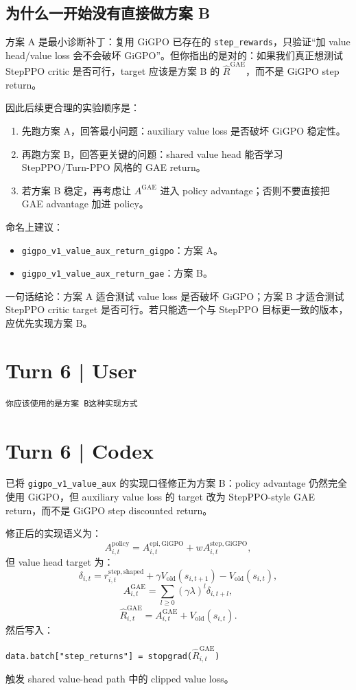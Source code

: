 \documentclass[10pt]{ctexart}
\newcommand{\code}[1]{\texttt{#1}}
\begin{document}
\subsection*{为什么一开始没有直接做方案 B}
方案 A 是最小诊断补丁：复用 GiGPO 已存在的 \code{step\_rewards}，只验证“加 value head/value loss 会不会破坏 GiGPO”。但你指出的是对的：如果我们真正想测试 StepPPO critic 是否可行，target 应该是方案 B 的 \(\hat R^{\mathrm{GAE}}\)，而不是 GiGPO step return。

因此后续更合理的实验顺序是：
\begin{enumerate}
  \item 先跑方案 A，回答最小问题：auxiliary value loss 是否破坏 GiGPO 稳定性。
  \item 再跑方案 B，回答更关键的问题：shared value head 能否学习 StepPPO/Turn-PPO 风格的 GAE return。
  \item 若方案 B 稳定，再考虑让 \(A^{\mathrm{GAE}}\) 进入 policy advantage；否则不要直接把 GAE advantage 加进 policy。
\end{enumerate}

命名上建议：
\begin{itemize}
  \item \code{gigpo\_v1\_value\_aux\_return\_gigpo}：方案 A。
  \item \code{gigpo\_v1\_value\_aux\_return\_gae}：方案 B。
\end{itemize}

一句话结论：方案 A 适合测试 value loss 是否破坏 GiGPO；方案 B 才适合测试 StepPPO critic target 是否可行。若只能选一个与 StepPPO 目标更一致的版本，应优先实现方案 B。

\section*{Turn 6 | User}
\begin{Verbatim}[breaklines=true,breakanywhere=true]
你应该使用的是方案 B这种实现方式
\end{Verbatim}

\section*{Turn 6 | Codex}
已将 \code{gigpo\_v1\_value\_aux} 的实现口径修正为方案 B：policy advantage 仍然完全使用 GiGPO，但 auxiliary value loss 的 target 改为 StepPPO-style GAE return，而不是 GiGPO step discounted return。

修正后的实现语义为：
\[
A_{i,t}^{\mathrm{policy}}
=
A_{i,t}^{\mathrm{epi,GiGPO}}
+wA_{i,t}^{\mathrm{step,GiGPO}},
\]
但 value head target 为：
\[
\delta_{i,t}
=
 r_{i,t}^{\mathrm{step,shaped}}
 +\gamma V_{\mathrm{old}}(s_{i,t+1})
 -V_{\mathrm{old}}(s_{i,t}),
\]
\[
A_{i,t}^{\mathrm{GAE}}
=
\sum_{l\ge 0}(\gamma\lambda)^l\delta_{i,t+l},
\]
\[
\hat R_{i,t}^{\mathrm{GAE}}
=A_{i,t}^{\mathrm{GAE}}+V_{\mathrm{old}}(s_{i,t}).
\]
然后写入：
\begin{center}
\code{data.batch["step\_returns"] = stopgrad(}\(\hat R_{i,t}^{\mathrm{GAE}}\)\code{)}
\end{center}
触发 shared value-head path 中的 clipped value loss。
\end{document}
